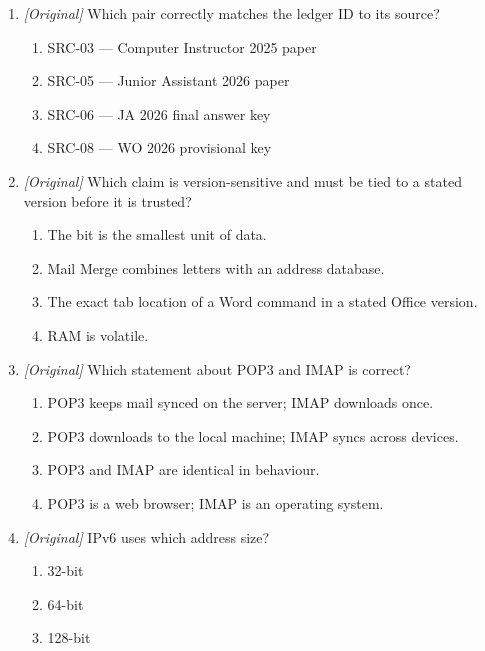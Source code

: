 \documentclass[11pt]{article}
\begin{document}
\begin{enumerate}[label=\textbf{Q\arabic*.}, leftmargin=*]
\begin{enumerate}[label=\Alph*.]
    \item I and II only
    \item II and III only
    \item I and III only
    \item I, II, and III
  \end{enumerate}
\item \textit{[Original]} Which pair correctly matches the ledger ID to its source?
  \begin{enumerate}[label=\Alph*.]
    \item SRC-03 --- Computer Instructor 2025 paper
    \item SRC-05 --- Junior Assistant 2026 paper
    \item SRC-06 --- JA 2026 final answer key
    \item SRC-08 --- WO 2026 provisional key
  \end{enumerate}
\item \textit{[Original]} Which claim is version-sensitive and must be tied to a stated version before it is trusted?
  \begin{enumerate}[label=\Alph*.]
    \item The bit is the smallest unit of data.
    \item Mail Merge combines letters with an address database.
    \item The exact tab location of a Word command in a stated Office version.
    \item RAM is volatile.
  \end{enumerate}
\item \textit{[Original]} Which statement about POP3 and IMAP is correct?
  \begin{enumerate}[label=\Alph*.]
    \item POP3 keeps mail synced on the server; IMAP downloads once.
    \item POP3 downloads to the local machine; IMAP syncs across devices.
    \item POP3 and IMAP are identical in behaviour.
    \item POP3 is a web browser; IMAP is an operating system.
  \end{enumerate}
\item \textit{[Original]} IPv6 uses which address size?
  \begin{enumerate}[label=\Alph*.]
    \item 32-bit
    \item 64-bit
    \item 128-bit

\end{enumerate}
\end{enumerate}
\end{document}
